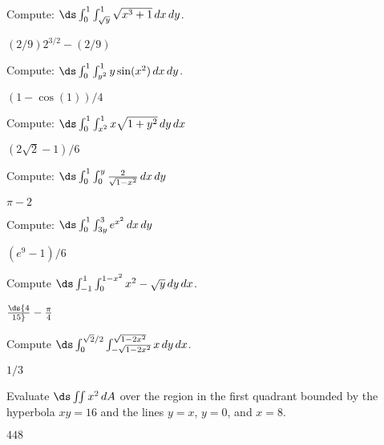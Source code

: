 \begin{enumialphparenastyle}
\begin{ex}
Compute: $\ds \int_0^1\int_{\sqrt{y}}^1 
\sqrt{x^3+1}\,dx\,dy$.
\begin{sol}
$(2/9)2^{3/2}-(2/9)$
\end{sol}
\end{ex}

\begin{ex}
Compute: $\ds \int_0^1\int_{y^2}^1 
y\sin(x^2)\,dx\,dy$.
\begin{sol}
$(1-\cos(1))/4$
\end{sol}
\end{ex}

\begin{ex}
Compute: $\ds \int_0^1 \int_{x^2}^1 x\sqrt{1+y^2}\,dy\,dx$
\begin{sol}
$(2\sqrt2-1)/6$
\end{sol}
\end{ex}

\begin{ex}
Compute: $\ds \int_0^1 \int_0^y
	  {2\over\sqrt{1-x^2}}\,dx\,dy$
\begin{sol}
$\pi-2$
\end{sol}
\end{ex}

\begin{ex}
Compute: $\ds \int_0^1 \int_{3y}^3
	  e^{x^2}\,dx\,dy$
\begin{sol}
$(e^9-1)/6$
\end{sol}
\end{ex}

\begin{ex}
Compute $\ds \int_{-1}^1\int_0^{1-x^2} x^2-\sqrt{y}\,dy\,dx$.
\begin{sol}
$\ds {4\over15}-{\pi\over4}$
\end{sol}
\end{ex}

\begin{ex}
Compute 
$\ds \int_{0}^{\sqrt2/2}\int_{-\sqrt{1-2x^2}}^{\sqrt{1-2x^2}} x\,dy\,dx$.
\begin{sol}
$1/3$
\end{sol}
\end{ex}

\begin{ex}
Evaluate $\ds\iint x^2\,dA$ over the region in the first
quadrant bounded by the hyperbola $xy=16$ and the lines $y=x$, $y=0$, and
$x=8$.
\begin{sol}
$448$
\end{sol}
\end{ex}


\end{enumialphparenastyle}
